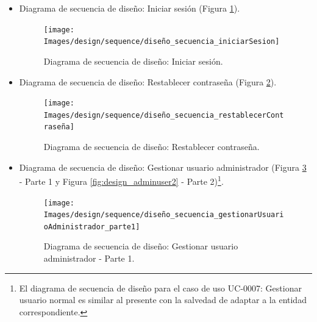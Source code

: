 \documentclass[12pt,a4paper, twoside]{report}
\begin{document}
\begin{itemize}
		\newpage
		
		\item Diagrama de secuencia de diseño: Iniciar sesión (Figura \ref{fig:design_iniciarSesion}).
		
		\begin{figure}[!ht]   
			\caption{Diagrama de secuencia de diseño: Iniciar sesión.} 
			\begin{center} 
	 			\texttt{[image: Images/design/sequence/diseño\_secuencia\_iniciarSesion]} \\
				\label{fig:design_iniciarSesion} 
			\end{center}  
		\end{figure} 
		
		\newpage
		
		\item Diagrama de secuencia de diseño: Restablecer contraseña (Figura \ref{fig:design_contraseña}).

		\begin{figure}[!ht]   
			\caption{Diagrama de secuencia de diseño: Restablecer contraseña.} 
			\begin{center} 
	 			\texttt{[image: Images/design/sequence/diseño\_secuencia\_restablecerContraseña]} \\
				\label{fig:design_contraseña} 
			\end{center}  
		\end{figure} 
		
		\newpage
		
		\item Diagrama de secuencia de diseño: Gestionar usuario administrador (Figura \ref{fig:design_adminuser1} - Parte 1 y Figura \ref{fig:design_adminuser2} - Parte 2)\footnote{El diagrama de secuencia de diseño para el caso de uso UC-0007: Gestionar usuario normal es similar al presente con la salvedad de adaptar a la entidad correspondiente.}.
		 
		\begin{figure}[!ht]   
			\caption{Diagrama de secuencia de diseño: Gestionar usuario administrador - Parte 1.} 
			\begin{center} 
	 			\texttt{[image: Images/design/sequence/diseño\_secuencia\_gestionarUsuarioAdministrador\_parte1]} \\
				\label{fig:design_adminuser1} 
			\end{center}  
		\end{figure} 
		
		\newpage
		

\end{itemize}
\end{document}
